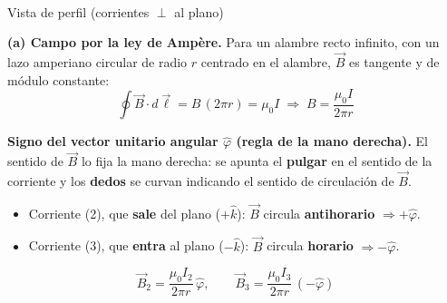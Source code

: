 \documentclass[12pt,letterpaper]{article}
\begin{document}
\noindent
\begin{minipage}[t]{0.40\textwidth}
\centering\vspace{0pt}
\\[2pt]
{\footnotesize Vista de perfil (corrientes $\perp$ al plano)}
\end{minipage}%
\hfill
\begin{minipage}[t]{0.57\textwidth}
\vspace{0pt}
\textbf{(a) Campo por la ley de Amp\`ere.} Para un alambre recto infinito, con un lazo amperiano
circular de radio $r$ centrado en el alambre, $\vec{B}$ es tangente y de m\'odulo constante:
\[
    \oint \vec{B}\cdot d\vec{\ell} = B\,(2\pi r) = \mu_0 I
    \;\Rightarrow\; B = \frac{\mu_0 I}{2\pi r}
\]
\end{minipage}

\medskip

\noindent\textbf{Signo del vector unitario angular $\hat{\varphi}$ (regla de la mano derecha).}
El sentido de $\vec{B}$ lo fija la mano derecha: se apunta el \textbf{pulgar} en el sentido de la
corriente y los \textbf{dedos} se curvan indicando el sentido de circulaci\'on de $\vec{B}$.
\begin{itemize}\setlength\itemsep{1pt}
    \item Corriente (2), que \textbf{sale} del plano ($+\hat{k}$): $\vec{B}$ circula
          \textbf{antihorario} $\Rightarrow +\hat{\varphi}$.
    \item Corriente (3), que \textbf{entra} al plano ($-\hat{k}$): $\vec{B}$ circula
          \textbf{horario} $\Rightarrow -\hat{\varphi}$.
\end{itemize}
\[
    \vec{B}_2 = \frac{\mu_0 I_2}{2\pi r}\,\hat{\varphi},
    \qquad
    \vec{B}_3 = \frac{\mu_0 I_3}{2\pi r}\,(-\hat{\varphi})
\]
\end{document}
